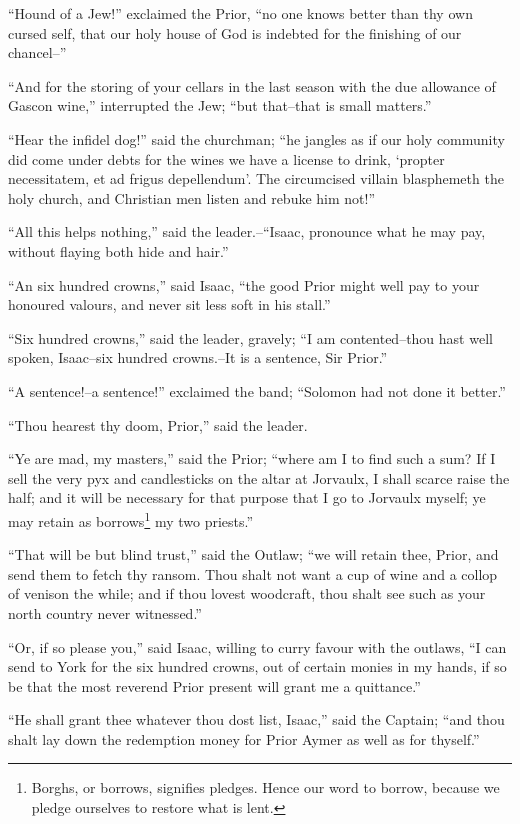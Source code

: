 ``Hound of a Jew!'' exclaimed the Prior, ``no one knows better than thy
own cursed self, that our holy house of God is indebted for the
finishing of our chancel--''

``And for the storing of your cellars in the last season with the due
allowance of Gascon wine,'' interrupted the Jew; ``but that--that is
small matters.''

``Hear the infidel dog!'' said the churchman; ``he jangles as if our
holy community did come under debts for the wines we have a license to
drink, `propter necessitatem, et ad frigus depellendum'. The circumcised
villain blasphemeth the holy church, and Christian men listen and rebuke
him not!''

``All this helps nothing,'' said the leader.--``Isaac, pronounce what he
may pay, without flaying both hide and hair.''

``An six hundred crowns,'' said Isaac, ``the good Prior might well pay
to your honoured valours, and never sit less soft in his stall.''

``Six hundred crowns,'' said the leader, gravely; ``I am contented--thou
hast well spoken, Isaac--six hundred crowns.--It is a sentence, Sir
Prior.''

``A sentence!--a sentence!'' exclaimed the band; ``Solomon had not done
it better.''

``Thou hearest thy doom, Prior,'' said the leader.

``Ye are mad, my masters,'' said the Prior; ``where am I to find such a
sum? If I sell the very pyx and candlesticks on the altar at Jorvaulx, I
shall scarce raise the half; and it will be necessary for that purpose
that I go to Jorvaulx myself; ye may retain as borrows\footnote{Borghs,
or borrows, signifies pledges. Hence our word to
borrow, because we pledge ourselves to restore what is lent.} my two
priests.''

``That will be but blind trust,'' said the Outlaw; ``we will retain
thee, Prior, and send them to fetch thy ransom. Thou shalt not want a
cup of wine and a collop of venison the while; and if thou lovest
woodcraft, thou shalt see such as your north country never witnessed.''

``Or, if so please you,'' said Isaac, willing to curry favour with the
outlaws, ``I can send to York for the six hundred crowns, out of certain
monies in my hands, if so be that the most reverend Prior present will
grant me a quittance.''

``He shall grant thee whatever thou dost list, Isaac,'' said the
Captain; ``and thou shalt lay down the redemption money for Prior Aymer
as well as for thyself.''

